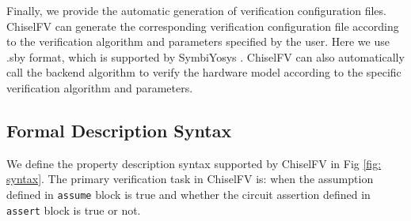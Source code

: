 \documentclass[conference]{IEEEtran}
\theoremstyle{definition}
\begin{document}
Finally, we provide the automatic generation of verification configuration files.
ChiselFV can generate the corresponding verification configuration file according to the verification algorithm and parameters specified by the user. Here we use .sby format, which is supported by SymbiYosys \cite{SymbiYosys}. ChiselFV can also automatically call the backend algorithm to verify the hardware model according to the specific verification algorithm and parameters.

\subsection{Formal Description Syntax}

We define the property description syntax supported by ChiselFV in Fig \ref{fig: syntax}.
The primary verification task in ChiselFV is: when the assumption defined in \verb|assume| block is true and whether the circuit assertion defined in \verb|assert| block is true or not. 
\end{document}
